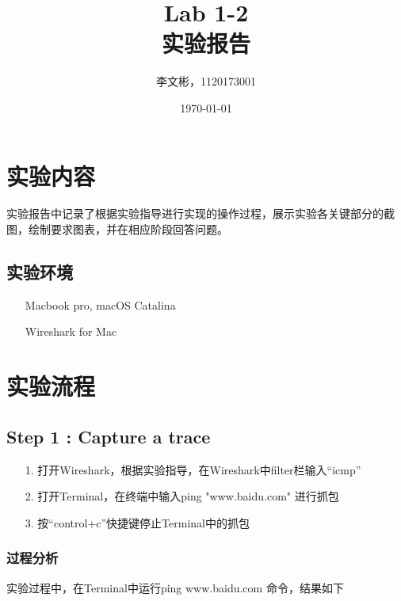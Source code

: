 \documentclass{article}
\title{Lab 1-2 \\实验报告}
\author{李文彬，1120173001}
\date{\today}
\begin{document}
	\maketitle
	\section{实验内容}
实验报告中记录了根据实验指导进行实现的操作过程，展示实验各关键部分的截图，绘制要求图表，并在相应阶段回答问题。
\subsection{实验环境}
\begin{itemize}
\item[]Macbook pro, macOS Catalina
\item[]Wireshark for Mac
\end{itemize}


\section{实验流程}
\subsection{Step 1 : Capture a trace}
   \begin{itemize}
\item[1.]打开Wireshark，根据实验指导，在Wireshark中filter栏输入“icmp”
\item[2.]打开Terminal，在终端中输入ping "www.baidu.com" 进行抓包
\item[3.]按“control+c”快捷键停止Terminal中的抓包
   \end{itemize}
   	\subsubsection{过程分析}
   实验过程中，在Terminal中运行ping www.baidu.com 命令，结果如下
   
%
%
%
%
%
%
%
    
\end{document}
